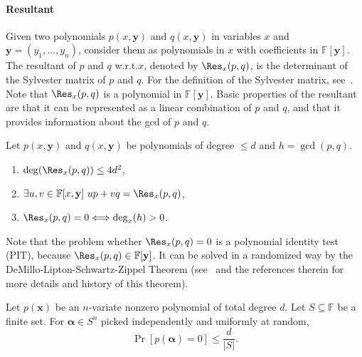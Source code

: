 \paragraph{Resultant}
Given two polynomials $p(x,\mathbf y)$ and $q(x,\mathbf y)$ in variables $x$ and $\mathbf y=(y_1,\ldots,y_n)$, consider them as polynomials in $x$ with coefficients in $\mathbb F[\mathbf y]$. The resultant of $p$ and $q$ w.r.t.$x$, denoted by $\Res_x(p,q)$, is the determinant of the Sylvester matrix of $p$ and $q$. For the definition of the Sylvester matrix, see~\cite{ref20}. Note that $\Res_x(p,q)$ is a polynomial in $\mathbb F[\mathbf y]$.
Basic properties of the resultant are that it can be represented as a linear combination of $p$ and $q$, and that it provides information about the gcd of $p$ and $q$.
\setcounter{nttheorem}{1}
\begin{ntlemma}
Let $p(x,\mathbf y)$ and $q(x,\mathbf y)$ be polynomials of degree $\leq d$ and $h=\gcd(p,q)$.
\begin{enumerate}\item $\deg(\Res_x(p,q))\leq4d^2$,\item $\exists u,v\in\mathbb F[x,\mathbf y]\ up+vq=\Res_x(p,q)$,\item $\Res_x(p,q)=0\Longleftrightarrow\deg_x(h)>0$.\end{enumerate}
\end{ntlemma}
Note that the problem whether $\Res_x(p,q)=0$ is a polynomial identity test (PIT), because $\Res_x(p,q)\in\mathbb F[\mathbf y]$. It can be solved in a randomized way by the DeMillo-Lipton-Schwartz-Zippel Theorem (see~\cite{ref4} and the references therein for more details and history of this theorem).
\begin{nttheorem}
Let $p(\mathbf x)$ be an $n$-variate nonzero polynomial of total degree $d$. Let $S\subseteq\mathbb F$ be a finite set. For $\boldsymbol\alpha\in S^n$ picked independently and uniformly at random,
\[\Pr[p(\boldsymbol\alpha)=0]\leq\frac d{|S|}.\]
\end{nttheorem}
